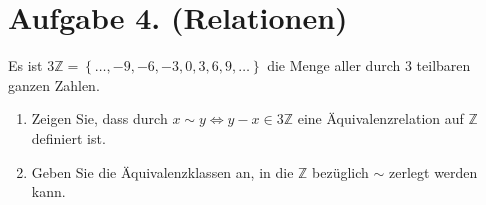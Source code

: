 \documentclass[german,12pt]{homework}
\begin{document}
    \section*{Aufgabe 4. (Relationen)}

    \begin{problem}
        Es ist \(3\mathbb{Z} = \left\{\ldots, -9, -6, -3, 0, 3, 6, 9, \ldots\right\}\) die Menge aller durch \(3\) teilbaren ganzen Zahlen.
        \begin{enumerate}
            \item Zeigen Sie, dass durch \(x \sim y \iff y - x \in 3\mathbb{Z}\) eine Äquivalenzrelation auf \(\mathbb{Z}\) definiert ist.
            \item Geben Sie die Äquivalenzklassen an, in die \(\mathbb{Z}\) bezüglich \(\sim\) zerlegt werden kann.
        \end{enumerate}
    \end{problem}
\end{document}
